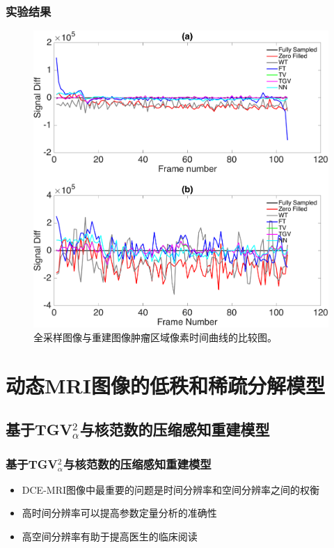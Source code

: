 \documentclass{beamer}
\begin{document}
\begin{frame}
	\frametitle{实验结果}
	\begin{figure}[htbp]
\centerline{\includegraphics[width=1\textwidth]{../img/qetsr/figure6.pdf}}
\caption{
全采样图像与重建图像肿瘤区域像素时间曲线的比较图。
}
\end{figure}
\end{frame}

\section{动态MRI图像的低秩和稀疏分解模型}

\subsection{基于TGV$_\alpha^2$与核范数的压缩感知重建模型}
\begin{frame}
	\frametitle{基于TGV$_\alpha^2$与核范数的压缩感知重建模型}
	\begin{itemize}
		\item DCE-MRI图像中最重要的问题是时间分辨率和空间分辨率之间的权衡
		\item 高时间分辨率可以提高参数定量分析的准确性
		\item 高空间分辨率有助于提高医生的临床阅读
	\end{itemize}
\end{frame}
\end{document}
